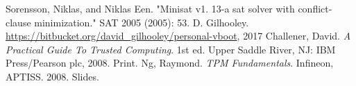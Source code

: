 \documentclass[../report.tex]{subfiles}
\begin{document}
\begin{singlespace}
\begin{flushleft}
\begin{footnotesize}
\begin{thebibliography}{\kern\bibindent}
    Sorensson, Niklas, and Niklas Een. "Minisat v1. 13-a sat solver with conflict-clause minimization." SAT 2005 (2005): 53.
    D. Gilhooley. \url{https://bitbucket.org/david\_gilhooley/personal-vboot}, 2017
    Challener, David. \textit{A Practical Guide To Trusted Computing}. 1st ed. Upper Saddle River, NJ: IBM Press/Pearson plc, 2008. Print.
    Ng, Raymond. \textit{TPM Fundamentals}. Infineon, APTISS. 2008. Slides.

\end{thebibliography}
\end{footnotesize}
\end{flushleft}
\end{singlespace}
\endgroup
\pagebreak
\end{document}
